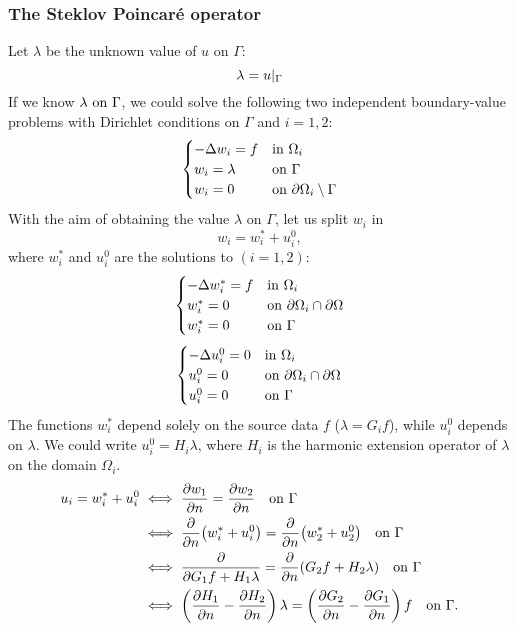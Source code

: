 \subsubsection*{The Steklov Poincaré operator}
Let \(\lambda\) be the unknown value of \(u\) on \(\Gamma\):
\[
    \lambda = u\vert_{\Gamma}
\]
If we know \(\lambda \text{ on }\Gamma\), we could solve the following two independent boundary-value problems with Dirichlet conditions on \(\Gamma\) and \(i=1,2\):
\begin{equation*}
    \begin{cases}
        -\Delta w_i = f & \text{in }\Omega_i \\
        w_i = \lambda & \text{on }\Gamma \\
        w_i = 0 & \text{on }{\partial\Omega}_i\setminus\Gamma
    \end{cases}
\end{equation*} 
With the aim of obtaining the value \(\lambda\) on \(\Gamma\), let us split \(w_i\) in 
\[
    w_i = w_i^* + u_i^0,
\]
where \(w_i^*\) and \(u_i^0\) are the solutions to \((i = 1,2)\):
\begin{equation*}
    \begin{cases}
        -\Delta w_i^* = f & \text{in } \Omega_i \\
        w_i^* = 0 & \text{on }{\partial\Omega}_i \cap {\partial\Omega} \\ 
        w_i^* = 0 & \text{on }\Gamma
    \end{cases}
\end{equation*}
\begin{equation*}
    \begin{cases}
        -\Delta u_i^0 = 0 & \text{in } \Omega_i \\
        u_i^0 = 0 & \text{on }{\partial\Omega}_i \cap {\partial\Omega} \\ 
        u_i^0 = 0 & \text{on }\Gamma
    \end{cases}
\end{equation*}
The functions \(w^*_i\) depend solely on the source data \(f\) (\(\lambda = G_i f\)), while \(u_i^0\) depends on \(\lambda\).
We could write \(u_i^0 = H_i\lambda\), where \(H_i\) is the harmonic extension operator of \(\lambda\) on the domain \(\Omega_i\).
\begin{align*}
    u_i = w^*_i + u_i^0 &\iff \partialderivative{w_1}{n} = \partialderivative{w_2}{n} \quad \txt{on }\Gamma \\
    &\iff \pderivative{n}(w_i^* + u_i^0) = \pderivative{n}(w_2^* + u_2^0) \quad \txt{on }\Gamma \\
    &\iff \pderivative{G_1 f + H_1\lambda} = \pderivative{n}(G_2 f + H_2 \lambda) \quad \txt{on }\Gamma \\
    &\iff \left( \partialderivative{H_1}{n} - \partialderivative{H_2}{n} \right)\lambda = \left( \partialderivative{G_2}{n} - \partialderivative{G_1}{n} \right) f \quad \txt{on }\Gamma.
\end{align*}

